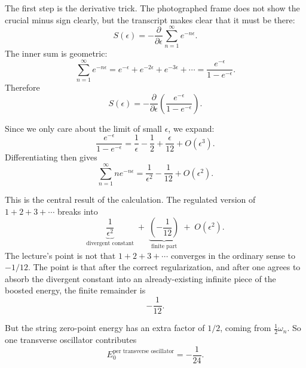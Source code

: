 The first step is the derivative trick. The photographed frame does not show the crucial minus sign clearly, but the transcript makes clear that it must be there:
\begin{equation}
S(\epsilon)
=
-\frac{\partial}{\partial\epsilon}\sum_{n=1}^{\infty} e^{-n\epsilon}.
\end{equation}
The inner sum is geometric:
\begin{equation}
\sum_{n=1}^{\infty} e^{-n\epsilon}
=
e^{-\epsilon}+e^{-2\epsilon}+e^{-3\epsilon}+\cdots
=
\frac{e^{-\epsilon}}{1-e^{-\epsilon}}.
\end{equation}
Therefore
\begin{equation}
S(\epsilon)
=
-\frac{\partial}{\partial\epsilon}
\left(
\frac{e^{-\epsilon}}{1-e^{-\epsilon}}
\right).
\end{equation}

Since we only care about the limit of small \(\epsilon\), we expand:
\begin{equation}
\frac{e^{-\epsilon}}{1-e^{-\epsilon}}
=
\frac{1}{\epsilon}-\frac{1}{2}+\frac{\epsilon}{12}+O(\epsilon^{3}).
\end{equation}
Differentiating then gives
\begin{equation}
\sum_{n=1}^{\infty} n e^{-n\epsilon}
=
\frac{1}{\epsilon^{2}}-\frac{1}{12}+O(\epsilon^{2}).
\end{equation}

This is the central result of the calculation. The regulated version of \(1+2+3+\cdots\) breaks into
\begin{equation}
\underbrace{\frac{1}{\epsilon^{2}}}_{\text{divergent constant}}
\;+\;
\underbrace{\left(-\frac{1}{12}\right)}_{\text{finite part}}
\;+\;
O(\epsilon^{2}).
\end{equation}
The lecture's point is not that \(1+2+3+\cdots\) converges in the ordinary sense to \(-1/12\). The point is that after the correct regularization, and after one agrees to absorb the divergent constant into an already-existing infinite piece of the boosted energy, the finite remainder is
\begin{equation}
-\frac{1}{12}.
\end{equation}

But the string zero-point energy has an extra factor of \(1/2\), coming from \(\frac{1}{2}\omega_{n}\). So one transverse oscillator contributes
\begin{equation}
E_{0}^{\text{per transverse oscillator}}=-\frac{1}{24}.
\end{equation}

